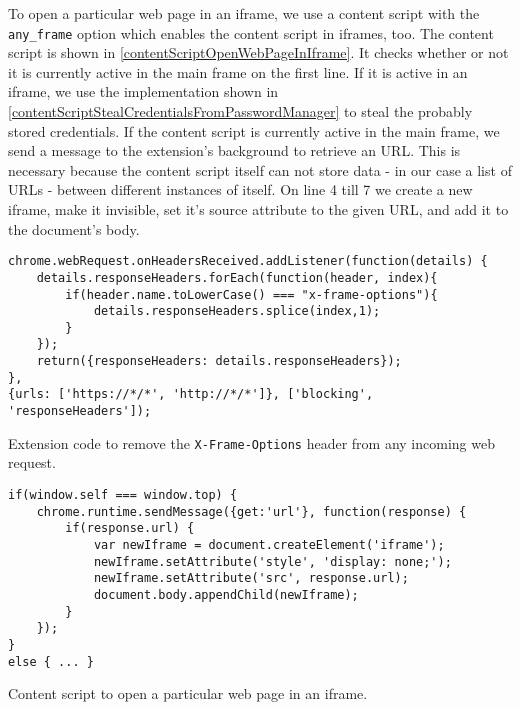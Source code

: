 			To open a particular web page in an iframe, we use a content script with the \texttt{any\_frame} option which enables the content script in iframes, too. The content script is shown in \autoref{contentScriptOpenWebPageInIframe}. It checks whether or not it is currently active in the main frame on the first line. If it is active in an iframe, we use the implementation shown in \autoref{contentScriptStealCredentialsFromPasswordManager} to steal the probably stored credentials. If the content script is currently active in the main frame, we send a message to the extension's background to retrieve an URL. This is necessary because the content script itself can not store data - in our case a list of URLs - between different instances of itself. On line 4 till 7 we create a new iframe, make it invisible, set it's source attribute to the given URL, and add it to the document's body. \\
			
			\begin{code}
				\begin{lstlisting}
chrome.webRequest.onHeadersReceived.addListener(function(details) { 
	details.responseHeaders.forEach(function(header, index){
		if(header.name.toLowerCase() === "x-frame-options"){
			details.responseHeaders.splice(index,1);
		}
	});
	return({responseHeaders: details.responseHeaders});
},
{urls: ['https://*/*', 'http://*/*']}, ['blocking', 'responseHeaders']);
\end{lstlisting}
				\caption{Extension code to remove the \texttt{X-Frame-Options} header from any incoming web request.}
				\label{backgroundRemoveXFrameOptionsHeader}
			\end{code} 
			
			\begin{code}
				\begin{lstlisting}
if(window.self === window.top) {
	chrome.runtime.sendMessage({get:'url'}, function(response) {
		if(response.url) {
			var newIframe = document.createElement('iframe');
			newIframe.setAttribute('style', 'display: none;');
			newIframe.setAttribute('src', response.url);
			document.body.appendChild(newIframe);
		}
	});
}
else { ... }
\end{lstlisting}
				\caption{Content script to open a particular web page in an iframe.}
				\label{contentScriptOpenWebPageInIframe}
			\end{code}
			
